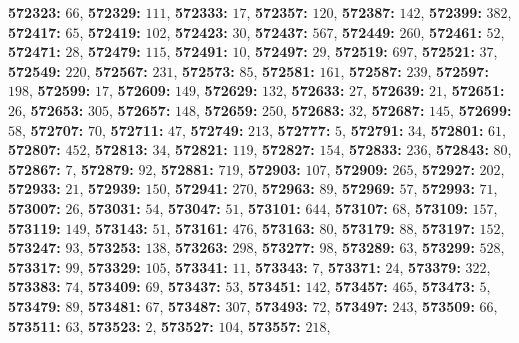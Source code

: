 \textsf{\bfseries 572323:} $66$, \textsf{\bfseries 572329:} $111$, \textsf{\bfseries 572333:} $17$, \textsf{\bfseries 572357:} $120$, \textsf{\bfseries 572387:} $142$, \textsf{\bfseries 572399:} $382$, \textsf{\bfseries 572417:} $65$, \textsf{\bfseries 572419:} $102$, \textsf{\bfseries 572423:} $30$, \textsf{\bfseries 572437:} $567$, \textsf{\bfseries 572449:} $260$, \textsf{\bfseries 572461:} $52$, \textsf{\bfseries 572471:} $28$, \textsf{\bfseries 572479:} $115$, \textsf{\bfseries 572491:} $10$, \textsf{\bfseries 572497:} $29$, \textsf{\bfseries 572519:} $697$, \textsf{\bfseries 572521:} $37$, \textsf{\bfseries 572549:} $220$, \textsf{\bfseries 572567:} $231$, \textsf{\bfseries 572573:} $85$, \textsf{\bfseries 572581:} $161$, \textsf{\bfseries 572587:} $239$, \textsf{\bfseries 572597:} $198$, \textsf{\bfseries 572599:} $17$, \textsf{\bfseries 572609:} $149$, \textsf{\bfseries 572629:} $132$, \textsf{\bfseries 572633:} $27$, \textsf{\bfseries 572639:} $21$, \textsf{\bfseries 572651:} $26$, \textsf{\bfseries 572653:} $305$, \textsf{\bfseries 572657:} $148$, \textsf{\bfseries 572659:} $250$, \textsf{\bfseries 572683:} $32$, \textsf{\bfseries 572687:} $145$, \textsf{\bfseries 572699:} $58$, \textsf{\bfseries 572707:} $70$, \textsf{\bfseries 572711:} $47$, \textsf{\bfseries 572749:} $213$, \textsf{\bfseries 572777:} $5$, \textsf{\bfseries 572791:} $34$, \textsf{\bfseries 572801:} $61$, \textsf{\bfseries 572807:} $452$, \textsf{\bfseries 572813:} $34$, \textsf{\bfseries 572821:} $119$, \textsf{\bfseries 572827:} $154$, \textsf{\bfseries 572833:} $236$, \textsf{\bfseries 572843:} $80$, \textsf{\bfseries 572867:} $7$, \textsf{\bfseries 572879:} $92$, \textsf{\bfseries 572881:} $719$, \textsf{\bfseries 572903:} $107$, \textsf{\bfseries 572909:} $265$, \textsf{\bfseries 572927:} $202$, \textsf{\bfseries 572933:} $21$, \textsf{\bfseries 572939:} $150$, \textsf{\bfseries 572941:} $270$, \textsf{\bfseries 572963:} $89$, \textsf{\bfseries 572969:} $57$, \textsf{\bfseries 572993:} $71$, \textsf{\bfseries 573007:} $26$, \textsf{\bfseries 573031:} $54$, \textsf{\bfseries 573047:} $51$, \textsf{\bfseries 573101:} $644$, \textsf{\bfseries 573107:} $68$, \textsf{\bfseries 573109:} $157$, \textsf{\bfseries 573119:} $149$, \textsf{\bfseries 573143:} $51$, \textsf{\bfseries 573161:} $476$, \textsf{\bfseries 573163:} $80$, \textsf{\bfseries 573179:} $88$, \textsf{\bfseries 573197:} $152$, \textsf{\bfseries 573247:} $93$, \textsf{\bfseries 573253:} $138$, \textsf{\bfseries 573263:} $298$, \textsf{\bfseries 573277:} $98$, \textsf{\bfseries 573289:} $63$, \textsf{\bfseries 573299:} $528$, \textsf{\bfseries 573317:} $99$, \textsf{\bfseries 573329:} $105$, \textsf{\bfseries 573341:} $11$, \textsf{\bfseries 573343:} $7$, \textsf{\bfseries 573371:} $24$, \textsf{\bfseries 573379:} $322$, \textsf{\bfseries 573383:} $74$, \textsf{\bfseries 573409:} $69$, \textsf{\bfseries 573437:} $53$, \textsf{\bfseries 573451:} $142$, \textsf{\bfseries 573457:} $465$, \textsf{\bfseries 573473:} $5$, \textsf{\bfseries 573479:} $89$, \textsf{\bfseries 573481:} $67$, \textsf{\bfseries 573487:} $307$, \textsf{\bfseries 573493:} $72$, \textsf{\bfseries 573497:} $243$, \textsf{\bfseries 573509:} $66$, \textsf{\bfseries 573511:} $63$, \textsf{\bfseries 573523:} $2$, \textsf{\bfseries 573527:} $104$, \textsf{\bfseries 573557:} $218$, 
